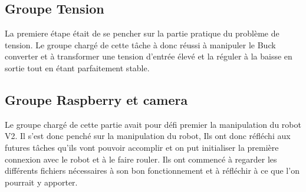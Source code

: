 \documentclass{PackagerQualityN}
\begin{document}
\vspace{0.1cm}
\vspace{0.1cm}

\subsection{Groupe Tension}

La premiere étape était de se pencher sur la partie pratique du problème de tension. Le groupe chargé de cette tâche à donc réussi à manipuler le Buck converter et à transformer une tension d'entrée élevé et la réguler à la baisse en sortie tout en étant parfaitement stable.





\subsection{Groupe Raspberry et camera}

Le groupe chargé de cette partie avait pour défi premier la manipulation du robot V2. Il s'est donc penché sur la manipulation du robot, Ils ont donc réfléchi aux futures tâches qu'ils vont pouvoir accomplir et on put initialiser la première connexion avec le robot et à le faire rouler.
Ils ont commencé à regarder les différents fichiers nécessaires à son bon fonctionnement et à réfléchir à ce que l'on pourrait y apporter.\\
\end{document}
